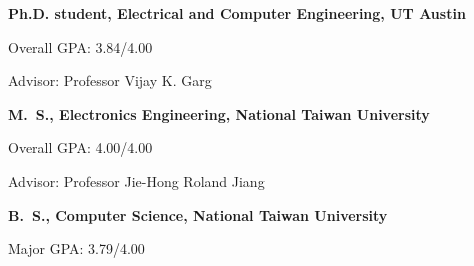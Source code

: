

\begin{myexp}
\item \textbf{Ph.D. student, Electrical and Computer Engineering, UT Austin}   
   \begin{myexp}
   \item Overall GPA: 3.84/4.00  
   \item Advisor: Professor Vijay K. Garg
   \end{myexp}
\item \textbf{M.~S., Electronics Engineering, National Taiwan University}  
   \begin{myexp}
   \item Overall GPA: 4.00/4.00
   \item Advisor: Professor  Jie-Hong Roland Jiang

   \end{myexp}
\item \textbf{B.~S., Computer Science, National Taiwan University}  
   \begin{myexp}
   \item Major GPA: 3.79/4.00 
   \end{myexp}
\end{myexp}

